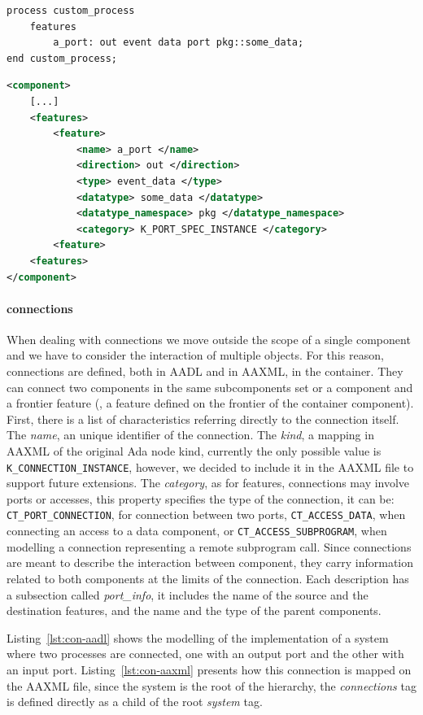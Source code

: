 \begin{lstlisting}[language=AADL,caption={Minimal AADL model containing features},label=lst:feature-aadl]
process custom_process
	features
		a_port: out event data port pkg::some_data;
end custom_process;
\end{lstlisting}

\begin{lstlisting}[language=XML,caption={AAXML description of AADL features},label=lst:feature-aaxml]
<component>
	[...]
	<features>
		<feature>
			<name> a_port </name>
			<direction> out </direction>
			<type> event_data </type>
			<datatype> some_data </datatype>
			<datatype_namespace> pkg </datatype_namespace>
			<category> K_PORT_SPEC_INSTANCE </category>
		<feature>
	<features>
</component>
\end{lstlisting}

\paragraph{connections} When dealing with connections we move outside the scope of a single component and we have to consider the interaction of multiple objects. For this reason, connections are defined, both in AADL and in AAXML, in the container. They can connect two components in the same subcomponents set or a component and a frontier feature (\ie, a feature defined on the frontier of the container component). First, there is a list of characteristics referring directly to the connection itself. The \textit{name}, an unique identifier of the connection. The \textit{kind}, a mapping in AAXML of the original Ada node kind, currently the only possible value is \texttt{K\_CONNECTION\_INSTANCE}, however, we decided to include it in the AAXML file to support future extensions. The \textit{category}, as for features, connections may involve ports or accesses, this property specifies the type of the connection, it can be: \texttt{CT\_PORT\_CONNECTION}, for connection between two ports, \texttt{CT\_ACCESS\_DATA}, when connecting an access to a data component, or \texttt{CT\_ACCESS\_SUBPROGRAM}, when modelling a connection representing a remote subprogram call. Since connections are meant to describe the interaction between component, they carry information related to both components at the limits of the connection. Each description has a subsection called \textit{port\_info}, it includes the name of the source and the destination features, and the name and the type of the parent components.

Listing~\ref{lst:con-aadl} shows the modelling of the implementation of a system where two processes are connected, one with an output port and the other with an input port. Listing~\ref{lst:con-aaxml} presents how this connection is mapped on the AAXML file, since the system is the root of the hierarchy, the \textit{connections} tag is defined directly as a child of the root \textit{system} tag.


